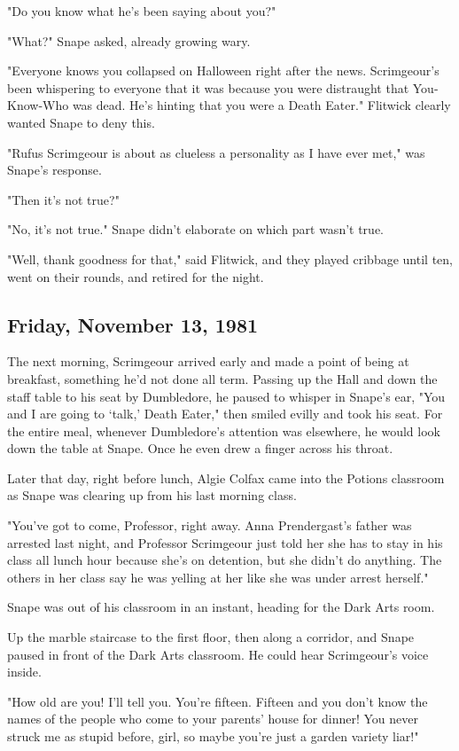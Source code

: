 "Do you know what he's been saying about you?"

"What?" Snape asked, already growing wary.

"Everyone knows you collapsed on Halloween right after the news. Scrimgeour's been whispering to everyone that it was because you were distraught that You-Know-Who was dead. He's hinting that you were a Death Eater." Flitwick clearly wanted Snape to deny this.

"Rufus Scrimgeour is about as clueless a personality as I have ever met," was Snape's response.

"Then it's not true?"

"No, it's not true." Snape didn't elaborate on which part wasn't true.

"Well, thank goodness for that," said Flitwick, and they played cribbage until ten, went on their rounds, and retired for the night.

\subsection{Friday, November 13, 1981}

The next morning, Scrimgeour arrived early and made a point of being at breakfast, something he'd not done all term. Passing up the Hall and down the staff table to his seat by Dumbledore, he paused to whisper in Snape's ear, "You and I are going to `talk,' Death Eater," then smiled evilly and took his seat. For the entire meal, whenever Dumbledore's attention was elsewhere, he would look down the table at Snape. Once he even drew a finger across his throat.

Later that day, right before lunch, Algie Colfax came into the Potions classroom as Snape was clearing up from his last morning class.

"You've got to come, Professor, right away. Anna Prendergast's father was arrested last night, and Professor Scrimgeour just told her she has to stay in his class all lunch hour because she's on detention, but she didn't do anything. The others in her class say he was yelling at her like she was under arrest herself."

Snape was out of his classroom in an instant, heading for the Dark Arts room.

Up the marble staircase to the first floor, then along a corridor, and Snape paused in front of the Dark Arts classroom. He could hear Scrimgeour's voice inside.

"How old are you! I'll tell you. You're fifteen. Fifteen and you don't know the names of the people who come to your parents' house for dinner! You never struck me as stupid before, girl, so maybe you're just a garden variety liar!"

